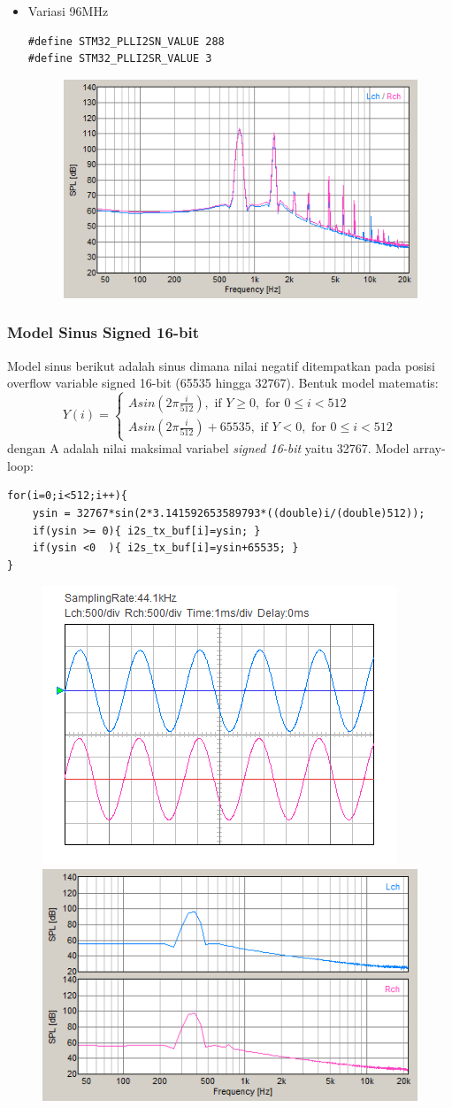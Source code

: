 \documentclass[12pt,]{article}
\begin{document}
\begin{itemize}
  		\item Variasi 96MHz
  		\begin{verbatim}
#define STM32_PLLI2SN_VALUE 288
#define STM32_PLLI2SR_VALUE 3
  		\end{verbatim}
  		\begin{figure}[H]
  			\centering
  			\includegraphics[width=0.45\linewidth]{result/day_2/sine_clk96}
  		\end{figure}
  	\end{itemize}

  	\newpage
  	\subsubsection{Model Sinus Signed 16-bit}
  	Model sinus berikut adalah sinus dimana nilai negatif ditempatkan
  	pada posisi overflow variable signed 16-bit (65535 hingga 32767).
  	Bentuk model matematis:
  	\[
  	Y(i) =
  	\begin{cases}
  	A sin(2 \pi \frac{i}{512}), \text{ if } Y \geq 0, \text{ for } 0 \leq i < 512\\
  	A sin(2 \pi \frac{i}{512})+65535, \text{ if } Y < 0, \text{ for } 0 \leq i < 512
  	\end{cases}
  	\]
  	dengan A adalah nilai maksimal variabel \textit{signed 16-bit} yaitu 32767.
  	Model array-loop:
  	\begin{verbatim}
for(i=0;i<512;i++){
  	ysin = 32767*sin(2*3.141592653589793*((double)i/(double)512));
  	if(ysin >= 0){ i2s_tx_buf[i]=ysin; }
  	if(ysin <0  ){ i2s_tx_buf[i]=ysin+65535; }
}
  	\end{verbatim}
  	\begin{figure}[H]
  		\centering
  		\includegraphics[width=0.45\linewidth]{result/day_4/newsine400}
  		\includegraphics[width=0.45\linewidth]{result/day_4/newsine400fft}
  	\end{figure}
\end{document}
